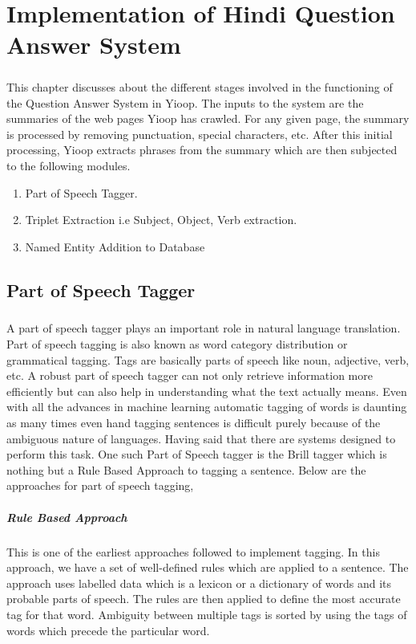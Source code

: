 \chapter{Implementation of Hindi Question Answer System}

\paragraph{}
This chapter discusses about the different stages involved in the functioning of the  Question Answer System in Yioop. The inputs to the system are the summaries of the web pages Yioop has crawled. For any given page, the summary is processed  by removing punctuation, special characters, etc. After this initial processing, Yioop extracts phrases from the summary which are then subjected to the following modules.

\begin{enumerate} 
\item Part of Speech Tagger.
\item Triplet Extraction i.e Subject, Object, Verb extraction.
\item Named Entity Addition to Database
\end{enumerate}

\section{Part of Speech Tagger}
\paragraph{}
A part of speech tagger plays an important role in natural language translation. Part of speech tagging is also known as word category distribution or grammatical tagging. Tags are basically parts of speech like noun, adjective, verb, etc.   A robust part of speech tagger  can not only retrieve information more efficiently but can also help in understanding what the text actually means. Even with all the advances in machine learning automatic tagging of words  is daunting as many times even hand tagging sentences is difficult purely because of the ambiguous nature of languages. Having said that there are systems designed to perform this task. One such Part of Speech tagger is the Brill tagger  \cite {brill1992simple} which is nothing but a Rule Based Approach to tagging a sentence. Below are the approaches for part of speech tagging, 

\paragraph{Rule Based Approach}
This is one of the earliest approaches followed to implement tagging. In this approach, we have a set of well-defined rules which are applied to a sentence. The approach uses labelled data which is a lexicon or a dictionary of words and its probable parts of speech. 
The rules are then applied to define the most accurate tag for that word. Ambiguity between multiple tags is sorted by using the tags of words which precede the particular word.
	
